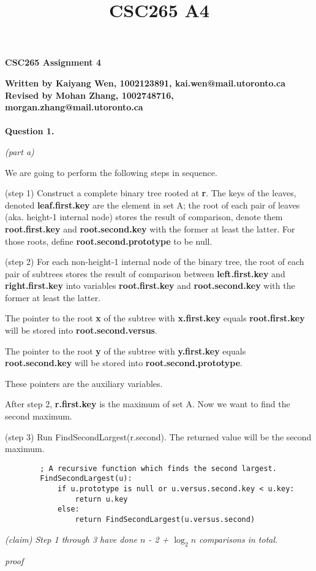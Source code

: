 \documentclass[a4paper, 10pt]{article}
\title{CSC265 A4}
\begin{document}
\begin{center}
{\LARGE \bf CSC265 Assignment 4}\\
\end{center}
\textbf{Written by Kaiyang Wen, 1002123891, kai.wen@mail.utoronto.ca }\\
\textbf{Revised by Mohan Zhang, 1002748716, morgan.zhang@mail.utoronto.ca }\\\\
{\noindent\large\textbf{Question 1.}}

{\setmainfont{Arial}
{\noindent\large\it(part a)}

We are going to perform the following steps in sequence.

{\setmainfont{Times New Roman}
(step 1) Construct a complete binary tree rooted at \textbf{r}. The keys of the leaves, denoted \textbf{leaf.first.key} are the element in set A; the root of each pair of leaves (aka. height-1 internal node) stores the result of comparison, denote them \textbf{root.first.key} and \textbf{root.second.key} with the former at least the latter. For those roots, define \textbf{root.second.prototype} to be null.

(step 2) For each non-height-1 internal node of the binary tree, the root of each pair of subtrees stores the result of comparison between \textbf{left.first.key} and \textbf{right.first.key} into variables \textbf{root.first.key} and \textbf{root.second.key} with the former at least the latter. 

The pointer to the root \textbf{x} of the subtree with \textbf{x.first.key} equals \textbf{root.first.key} will be stored into \textbf{root.second.versus}.

The pointer to the root \textbf{y} of the subtree with \textbf{y.first.key} equals \textbf{root.second.key} will be stored into \textbf{root.second.prototype}.

These pointers are the auxiliary variables.

After step 2, \textbf{r.first.key} is the maximum of set A. Now we want to find the second maximum.

(step 3) Run FindSecondLargest(r.second). The returned value will be the second maximum.
\begin{lstlisting}
        ; A recursive function which finds the second largest.
        FindSecondLargest(u):
            if u.prototype is null or u.versus.second.key < u.key:
                return u.key
            else:
                return FindSecondLargest(u.versus.second)
\end{lstlisting}
}
{\it
(claim) Step 1 through 3 have done $n$ - 2 + $\log_2 n$ comparisons in total.
}
\begin{addmargin}[15pt]{0in}
{
\textit{proof}

}
\end{addmargin}}
\end{document}
